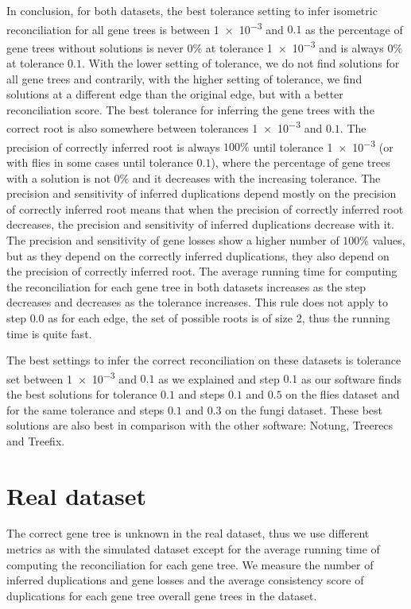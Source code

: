 In conclusion, for both datasets, the best tolerance setting to infer isometric reconciliation for all gene trees is between \num{1e-3} and $0.1$ as the percentage of gene trees without solutions is never $0\%$ at tolerance \num{1e-3} and is always $0\%$ at tolerance $0.1$. With the lower setting of tolerance, we do not find solutions for all gene trees and contrarily, with the higher setting of tolerance, we find solutions at a different edge than the original edge, but with a better reconciliation score. The best tolerance for inferring the gene trees with the correct root is also somewhere between tolerances \num{1e-3} and $0.1$. The precision of correctly inferred root is always $100\%$ until tolerance \num{1e-3} (or with flies in some cases until tolerance $0.1$), where the percentage of gene trees with a solution is not $0\%$ and it decreases with the increasing tolerance. The precision and sensitivity of inferred duplications depend mostly on the precision of correctly inferred root means that when the precision of correctly inferred root decreases, the precision and sensitivity of inferred duplications decrease with it. The precision and sensitivity of gene losses show a higher number of $100\%$ values, but as they depend on the correctly inferred duplications, they also depend on the precision of correctly inferred root. The average running time for computing the reconciliation for each gene tree in both datasets increases as the step decreases and decreases as the tolerance increases. This rule does not apply to step $0.0$ as for each edge, the set of possible roots is of size 2, thus the running time is quite fast.

The best settings to infer the correct reconciliation on these datasets is tolerance set between \num{1e-3} and $0.1$ as we explained and step $0.1$ as our software finds the best solutions for tolerance $0.1$ and steps $0.1$ and $0.5$ on the flies dataset and for the same tolerance and steps $0.1$ and $0.3$ on the fungi dataset. These best solutions are also best in comparison with the other software: Notung, Treerecs and Treefix.


\section{Real dataset}

The correct gene tree is unknown in the real dataset, thus we use different metrics as with the simulated dataset except for the average running time of computing the reconciliation for each gene tree. We measure the number of inferred duplications and gene losses and the average consistency score of duplications for each gene tree overall gene trees in the dataset.


